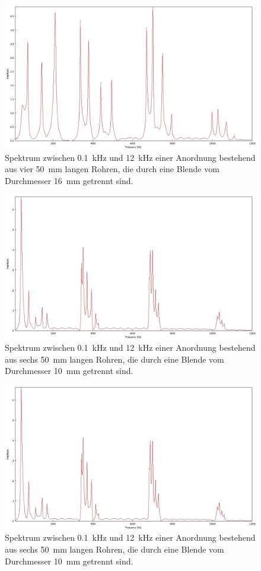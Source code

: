 \begin{figure}
\centering
\includegraphics[width=\textwidth]{content/messungen/Chapter4b/4b_4_4_16.jpg}
\caption{Spektrum zwischen 0.1~kHz und 12~kHz einer Anordnung bestehend aus vier 50~mm langen Rohren, die durch eine Blende vom Durchmesser 16~mm getrennt sind.}
\label{fig:4b_4_4_16}
\end{figure}
\begin{figure}
\centering
\includegraphics[width=\textwidth]{content/messungen/Chapter4b/4b_4_6_10.jpg}
\caption{Spektrum zwischen 0.1~kHz und 12~kHz einer Anordnung bestehend aus sechs 50~mm langen Rohren, die durch eine Blende vom Durchmesser 10~mm getrennt sind.}
\label{fig:4b_4_6_10}
\end{figure}
\begin{figure}
\centering
\includegraphics[width=\textwidth]{content/messungen/Chapter4b/4b_4_6_10.jpg}
\caption{Spektrum zwischen 0.1~kHz und 12~kHz einer Anordnung bestehend aus sechs 50~mm langen Rohren, die durch eine Blende vom Durchmesser 10~mm getrennt sind.}
\label{fig:4b_4_6_13}
\end{figure}
